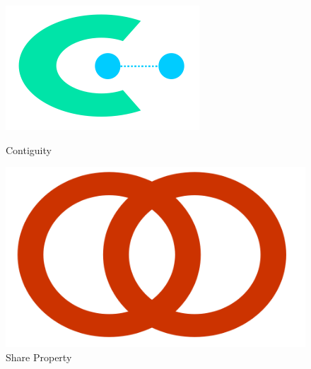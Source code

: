 \documentclass[12pt]{article}
\begin{document}
\begin{figure}[h!]
  \centering
  \begin{minipage}{.45\textwidth}
    \centering
    \includegraphics[width=\linewidth]{images/cont.png}
    \caption{Contiguity}
    \label{fig:cont}
  \end{minipage}\hfill
  \begin{minipage}{.45\textwidth}
    \centering
    \includegraphics[width=\linewidth]{images/share.png}
    \caption{Share Property}
    \label{fig:share}
  \end{minipage}\hfill
\end{figure}
\end{document}
